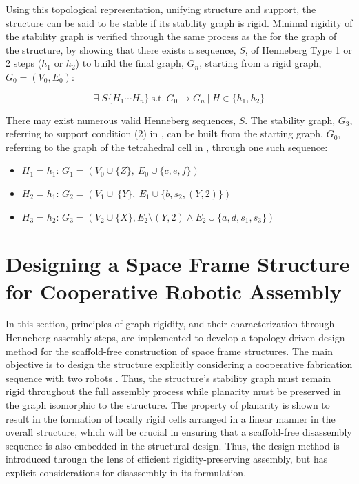     Using this topological representation, unifying structure and support, the structure can be said to be stable if its stability graph is rigid. Minimal rigidity of the stability graph is verified through the same process as the for the graph of the structure, by showing that there exists a sequence, $S$, of Henneberg Type 1 or 2 steps ($h_1$ or $h_2$) to build the final graph, $G_n$, starting from a rigid graph, $G_0 = (V_0,E_0)$:
    
    \begin{equation}
        \exists \; S\{H_1\cdots H_n\} \ \text{s.t.} \ G_0\rightarrow G_n \ | \ H \in \{h_1,h_2\}
    \end{equation}
    	
    There may exist numerous valid Henneberg sequences, $S$. The stability graph, $G_3$, referring to support condition (2) in , can be built from the starting graph, $G_0$, referring to the graph of the tetrahedral cell in , through one such sequence:
    
    \begin{itemize}
        \item $H_1 = h_1$: $G_1 = (V_0\cup \{Z\},\ E_0 \cup \{c,e,f\})$
        \item $H_2 = h_1$: $G_2 = (V_1\cup\ \{Y\},\ E_1 \cup \{b,s_2,(Y,2)\})$
        \item $H_3 = h_2$: $G_3 = (V_2 \cup \{X\}, E_2 \setminus (Y,2) \land E_2 \cup \{a,d,s_1,s_3\})$
    \end{itemize}
	
	
\section{Designing a Space Frame Structure for Cooperative Robotic Assembly} \label{sec:4_assembly}
     In this section, principles of graph rigidity, and their characterization through Henneberg assembly steps, are implemented to develop a topology-driven design method for the scaffold-free construction of space frame structures. The main objective is to design the structure explicitly considering a cooperative fabrication sequence with two robots \citep{parascho_cooperative_2019}. Thus, the structure's stability graph must remain rigid throughout the full assembly process while planarity must be preserved in the graph isomorphic to the structure. The property of planarity is shown to result in the formation of locally rigid cells arranged in a linear manner in the overall structure, which will be crucial in ensuring that a scaffold-free disassembly sequence is also embedded in the structural design. Thus, the design method is introduced through the lens of efficient rigidity-preserving assembly, but has explicit considerations for disassembly in its formulation.
     

